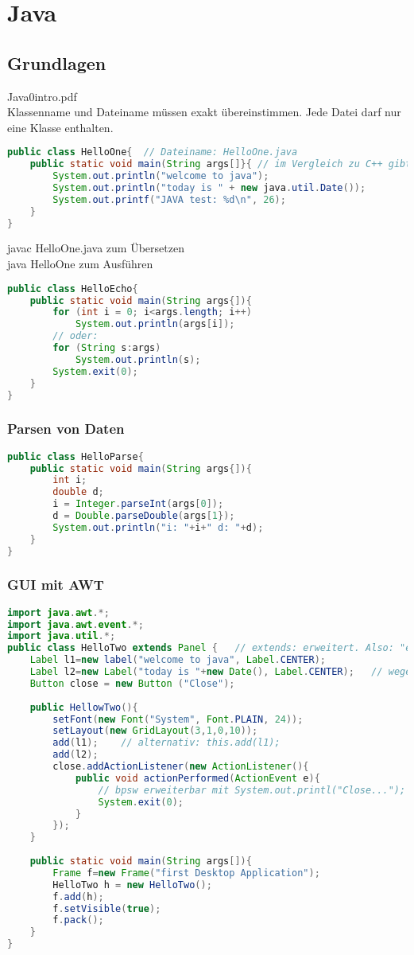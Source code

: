 \chapter{Java}
\section{Grundlagen}
Java0intro.pdf\\
Klassenname und Dateiname müssen exakt übereinstimmen. Jede Datei darf nur eine Klasse enthalten.
\begin{lstlisting}[language=Java]
public class HelloOne{	// Dateiname: HelloOne.java
	public static void main(String args[]}{	// im Vergleich zu C++ gibt es keinen public-Bereich, die Eigenschaft muss vor jede Funktion/Variabel geschrieben werden.
		System.out.println("welcome to java");
		System.out.println("today is " + new java.util.Date());
		System.out.printf("JAVA test: %d\n", 26);
	}
}
\end{lstlisting}
javac HelloOne.java zum Übersetzen\\
java HelloOne zum Ausführen
\begin{lstlisting}[language=Java]
public class HelloEcho{
	public static void main(String args{]){
		for (int i = 0; i<args.length; i++)
			System.out.println(args[i]);
		// oder:
		for (String s:args)
			System.out.println(s);
		System.exit(0);
	}
}
\end{lstlisting}
\subsection{Parsen von Daten}
\begin{lstlisting}[language=Java]
public class HelloParse{
	public static void main(String args{]){
		int i;
		double d;
		i = Integer.parseInt(args[0]);
		d = Double.parseDouble(args[1});
		System.out.println("i: "+i+" d: "+d);
	}
}
\end{lstlisting}
\subsection{GUI mit AWT}
\begin{lstlisting}[language=Java]
import java.awt.*;
import java.awt.event.*;
import java.util.*;
public class HelloTwo extends Panel {	// extends: erweitert. Also: "erbt von"
	Label l1=new label("welcome to java", Label.CENTER);
	Label l2=new Label("today is "+new Date(), Label.CENTER);	// wegen import javo.util.* kann hier nur Date() geschrieben werden.
	Button close = new Button ("Close");
	
	public HellowTwo(){
		setFont(new Font("System", Font.PLAIN, 24));
		setLayout(new GridLayout(3,1,0,10));
		add(l1);	// alternativ: this.add(l1);
		add(l2);
		close.addActionListener(new ActionListener(){
			public void actionPerformed(ActionEvent e){
				// bpsw erweiterbar mit System.out.printl("Close...");
				System.exit(0);
			}
		});
	}
	
	public static void main(String args[]){
		Frame f=new Frame("first Desktop Application");
		HelloTwo h = new HelloTwo();
		f.add(h);
		f.setVisible(true);
		f.pack();
	}
}
\end{lstlisting}

